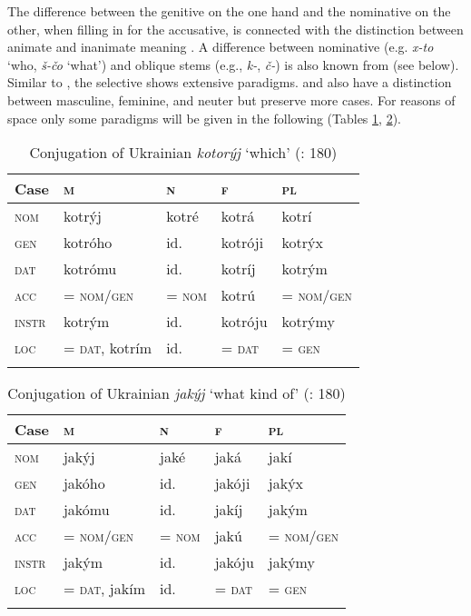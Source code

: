 The difference between the genitive on the one hand and the nominative on the other, when filling in for the accusative, is connected with the distinction between animate and inanimate meaning \citep[127]{Cubberley2002}. A difference between nominative (e.g.  \textit{x-to} ‘who, \textit{š-čo} ‘what’) and oblique stems (e.g.,  \textit{k-}, \textit{č-}) is also known from  (see below). Similar to , the selective  shows extensive paradigms.  and  also have a distinction between masculine, feminine, and neuter  but preserve more cases. For reasons of space only some   paradigms will be given in the following (Tables \ref{tab:indo:13}, \ref{tab:indo:14}).

\begin{table}[p]
\caption{Conjugation of Ukrainian \textit{kotorýj} ‘which’ (\citealt{PughPress1999}: 180)}
\label{tab:indo:13}
\small
\begin{tabularx}{\textwidth}{XXXXl}
\lsptoprule

\textbf{Case} & \textbf{\textsc{m}} & \textbf{\textsc{n}} & \textbf{\textsc{f}} & \textbf{\textsc{pl}}\\
\midrule
\textsc{nom} & kotrýj & kotré & kotrá & kotrí\\
\textsc{gen} & kotróho & id. & kotróji & kotrýx\\
\textsc{dat} & kotrómu & id. & kotríj & kotrým\\
\textsc{acc} & = \textsc{nom}/\textsc{gen} & = \textsc{nom} & kotrú & = \textsc{nom}/\textsc{gen}\\
\textsc{instr} & kotrým & id. & kotróju & kotrýmy\\
\textsc{loc} & = \textsc{dat}, kotrím & id. & = \textsc{dat} & = \textsc{gen}\\
\lspbottomrule
\end{tabularx}
\end{table}

\begin{table}[p]
\caption{Conjugation of Ukrainian \textit{jakýj} ‘what kind of’ (\citealt{PughPress1999}: 180)}
\label{tab:indo:14}

\small
\begin{tabularx}{\textwidth}{XXXXl}
\lsptoprule
\textbf{Case} & \textbf{\textsc{m}} & \textbf{\textsc{n}} & \textbf{\textsc{f}} & \textbf{\textsc{pl}}\\
\midrule
\textsc{nom} & jakýj & jaké & jaká & jakí\\
\textsc{gen} & jakóho & id. & jakóji & jakýx\\
\textsc{dat} & jakómu & id. & jakíj & jakým\\
\textsc{acc} & = \textsc{nom}/\textsc{gen} & = \textsc{nom} & jakú & = \textsc{nom}/\textsc{gen}\\
\textsc{instr} & jakým & id. & jakóju & jakýmy\\
\textsc{loc} & = \textsc{dat}, jakím & id. & = \textsc{dat} & = \textsc{gen}\\
\lspbottomrule
\end{tabularx}
\end{table}



